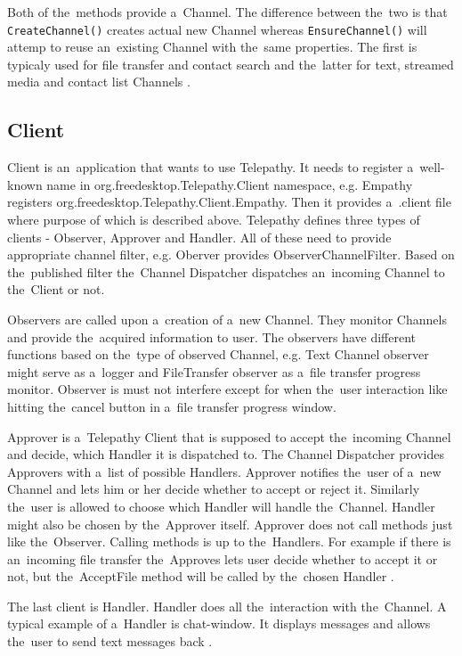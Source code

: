 Both of the~methods provide a~Channel. The difference between the~two is that \verb|CreateChannel()| creates actual new Channel whereas \verb|EnsureChannel()| will attemp to reuse an~existing Channel with the~same properties. The first is typicaly used for file transfer and contact search and the~latter for text, streamed media and contact list Channels \cite{TPWiki}.

\subsection*{Client}\label{subsect:tpClient}
Client is an~application that wants to use Telepathy. It needs to register a~well-known name in org.freedesktop.Telepathy.Client namespace, e.g. Empathy registers \newline org.freedesktop.Telepathy.Client.Empathy. Then it provides a~.client file where purpose of which is described above. Telepathy defines three types of clients - Observer, Approver and Handler. All of these need to provide appropriate channel filter, e.g. Oberver provides ObserverChannelFilter. Based on the~published filter the~Channel Dispatcher dispatches an~incoming Channel to the~Client or not.\cite{TPWiki}  

Observers are called upon a~creation of a~new Channel. They monitor Channels and provide the~acquired information to user. The observers have different functions based on the~type of observed Channel, e.g. Text Channel observer might serve as a~logger and FileTransfer observer as a~file transfer progress monitor. Observer is must not interfere except for when the~user interaction like hitting the~cancel button in a~file transfer progress window.\cite{TPWiki}     

Approver is a~Telepathy Client that is supposed to accept the~incoming Channel and decide, which Handler it is dispatched to. The Channel Dispatcher provides Approvers with a~list of possible Handlers. Approver notifies the~user of a~new Channel and lets him or her decide whether to accept or reject it. Similarly the~user is allowed to choose which Handler will handle the~Channel. Handler might also be chosen by the~Approver itself. Approver does not call methods just like the~Observer. Calling methods is up to the~Handlers. For example if there is an~incoming file transfer the~Approves lets user decide whether to accept it or not, but the~AcceptFile method will be called by the~chosen Handler \cite{TPWiki}.  

The last client is Handler. Handler does all the~interaction with the~Channel. A typical example of a~Handler is chat-window. It displays messages and allows the~user to send text messages back \cite{TPWiki}.  

